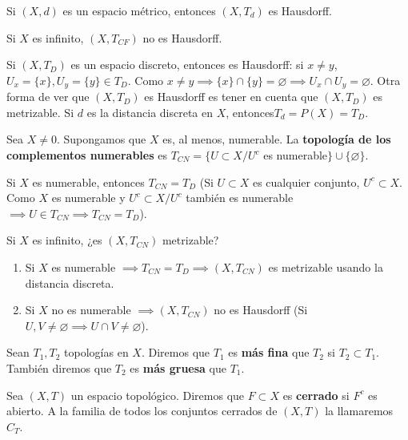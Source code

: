 \begin{exmp}
  Si $(X,d)$ es un espacio métrico, entonces $(X,T_d)$ es Hausdorff.
\end{exmp}
\begin{exmp}
  Si $X$ es infinito, $(X,T_{CF})$ no es Hausdorff.
\end{exmp}
\begin{exmp}
  Si $(X,T_D)$ es un espacio discreto, entonces es Hausdorff: si $x \neq y$, $U_x=\{x\}, U_y=\{y\} \in T_D$. Como $x \neq y \implies \{x\} \cap \{y\} = \varnothing \implies U_x \cap U_y = \varnothing $.
  Otra forma de ver que $(X,T_D)$ es Hausdorff es tener en cuenta que $(X,T_D)$ es metrizable. Si $d$ es la distancia discreta en $X$, entonces$T_d=P(X)=T_D$.
\end{exmp}

\begin{exmp}
  Sea $X \neq 0$. Supongamos que $X$ es, al menos, numerable. La \textbf{topología de los complementos numerables} es $T_{CN}=\{U \subset X / U^c$ es numerable$\} \cup \{\varnothing \}$.
\end{exmp}
Si $X$ es numerable, entonces $T_{CN}=T_D$ (Si $U \subset  X$ es cualquier conjunto, $U^c \subset X$. Como $X$ es numerable y $U^c \subset X / U^c$ también es numerable $\implies U \in T_{CN} \implies T_{CN} = T_D$).

Si $X$ es infinito, ¿es $(X, T_{CN})$ metrizable?
\begin{enumerate}
  \item Si $X$ es numerable $\implies T_{CN} = T_D \implies (X,T_{CN})$ es metrizable usando la distancia discreta.
  \item Si $X$ no es numerable $\implies (X,T_{CN})$ no es Hausdorff (Si $U,V \neq \varnothing \implies U \cap V \neq \varnothing $).
\end{enumerate}

\begin{ndef}
  Sean $T_1,T_2$ topologías en $X$. Diremos que $T_1$ es \textbf{más fina} que $T_2$ si $T_2 \subset T_1$. También diremos que $T_2$ es \textbf{más gruesa} que $T_1$.
\end{ndef}

\begin{ndef}
  Sea $(X,T)$ un espacio topológico. Diremos que $F \subset X$ es \textbf{cerrado} si $F^c$ es abierto. A la familia de todos los conjuntos cerrados de $(X,T)$ la llamaremos $C_T$.
\end{ndef}

